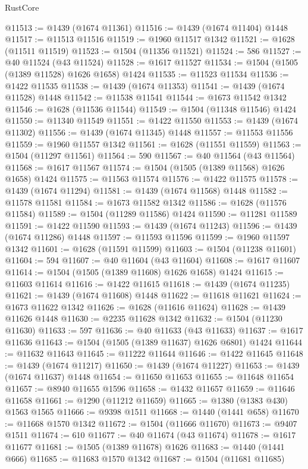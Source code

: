 \begin{lexlean}{RustCore}
\begin{coremodule}
@11513 := @1439 (@1674 @11361)
@11516 := @1439 (@1674 @11404) @1448
@11517 := @11513 @11516
@11519 := @1960 @11517 @1342
@11521 := @1628 (@11511 @11519)
@11523 := @1504 (@11356 @11521)
@11524 := 586
@11527 := @40 @11524 (@43 @11524)
@11528 := @1617 @11527
@11534 := @1504 (@1505 (@1389 @11528) @1626 @1658) @1424
@11535 := @11523 @11534
@11536 := @1422 @11535
@11538 := @1439 (@1674 @11353)
@11541 := @1439 (@1674 @11528) @1448
@11542 := @11538 @11541
@11544 := @1673 @11542 @1342
@11546 := @1628 (@11536 @11544)
@11549 := @1504 (@11348 @11546) @1424
@11550 := @11340 @11549
@11551 := @1422 @11550
@11553 := @1439 (@1674 @11302)
@11556 := @1439 (@1674 @11345) @1448
@11557 := @11553 @11556
@11559 := @1960 @11557 @1342
@11561 := @1628 (@11551 @11559)
@11563 := @1504 (@11297 @11561)
@11564 := 590
@11567 := @40 @11564 (@43 @11564)
@11568 := @1617 @11567
@11574 := @1504 (@1505 (@1389 @11568) @1626 @1658) @1424
@11575 := @11563 @11574
@11576 := @1422 @11575
@11578 := @1439 (@1674 @11294)
@11581 := @1439 (@1674 @11568) @1448
@11582 := @11578 @11581
@11584 := @1673 @11582 @1342
@11586 := @1628 (@11576 @11584)
@11589 := @1504 (@11289 @11586) @1424
@11590 := @11281 @11589
@11591 := @1422 @11590
@11593 := @1439 (@1674 @11243)
@11596 := @1439 (@1674 @11286) @1448
@11597 := @11593 @11596
@11599 := @1960 @11597 @1342
@11601 := @1628 (@11591 @11599)
@11603 := @1504 (@11238 @11601)
@11604 := 594
@11607 := @40 @11604 (@43 @11604)
@11608 := @1617 @11607
@11614 := @1504 (@1505 (@1389 @11608) @1626 @1658) @1424
@11615 := @11603 @11614
@11616 := @1422 @11615
@11618 := @1439 (@1674 @11235)
@11621 := @1439 (@1674 @11608) @1448
@11622 := @11618 @11621
@11624 := @1673 @11622 @1342
@11626 := @1628 (@11616 @11624)
@11628 := @1439 @11626 @1448
@11630 := @2235 @11628 @1342
@11632 := @1504 (@11230 @11630)
@11633 := 597
@11636 := @40 @11633 (@43 @11633)
@11637 := @1617 @11636
@11643 := @1504 (@1505 (@1389 @11637) @1626 @6801) @1424
@11644 := @11632 @11643
@11645 := @11222 @11644
@11646 := @1422 @11645
@11648 := @1439 (@1674 @11217)
@11650 := @1439 (@1674 @11227)
@11653 := @1439 (@1674 @11637) @1448
@11654 := @11650 @11653
@11655 := @11648 @11654
@11657 := @8940 @11655 @1596
@11658 := @1432 @11657
@11659 := @11646 @11658
@11661 := @1290 (@11212 @11659)
@11665 := @1380 (@1383 @430) @1563 @1565
@11666 := @9398 @1511
@11668 := @1440 (@1441 @658)
@11670 := @11668 @1570 @1342
@11672 := @1504 (@11666 @11670)
@11673 := @9407 @1511
@11674 := 610
@11677 := @40 @11674 (@43 @11674)
@11678 := @1617 @11677
@11681 := @1505 (@1389 @11678) @1626
@11683 := @1440 (@1441 @666)
@11685 := @11683 @1570 @1342
@11687 := @1504 (@11681 @11685)

\end{coremodule}
\end{lexlean}

